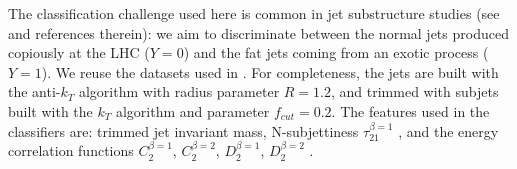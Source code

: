 \documentclass[twocolumn,superscriptaddress,aps]{revtex4-1}
\theoremstyle{plain}
\begin{document}






The classification challenge used here is common in jet substructure
studies (see \citep{Khachatryan:2014vla,ATL-PHYS-PUB-2015-033,wbosonATLAS} and
references therein): we aim to discriminate between  the normal jets produced copiously
at the LHC ($Y=0$) and  the fat jets coming from an exotic process ($Y=1$).
We reuse the datasets used in
\citep{baldi2016jet}.  For completeness, the jets are built with the
anti-$k_T$ algorithm \citep{Cacciari:2008gp}
with radius parameter $R=1.2$, and trimmed \citep{Krohn:2009th} with subjets built with
the $k_T$ algorithm and parameter $f_{cut}=0.2$. The features used
in the classifiers are: trimmed jet invariant mass, N-subjettiness
$\tau_{21}^{\beta=1}$ \citep{nsub,Thaler2012}, and the energy correlation
functions  $C_{2}^{\beta=1}$, $C_{2}^{\beta=2}$,
$D_{2}^{\beta=1}$, $D_{2}^{\beta=2}$ \citep{Larkoski2013}.
\end{document}
